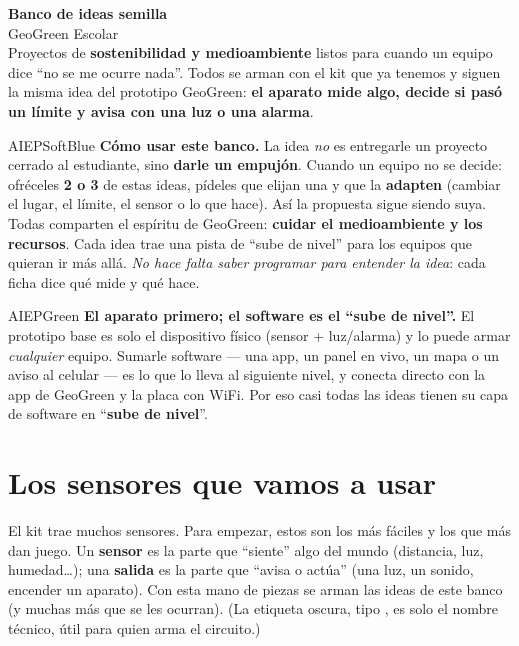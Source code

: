 \documentclass[11pt,letterpaper]{article}
\newcommand{\serig}[1]{%
  \tcbox[on line, colback=AIEPInk, colframe=AIEPInk, boxrule=0pt,
    arc=0.8mm, left=1.8mm, right=1.8mm, top=0.5mm, bottom=0.5mm]%
    {\small\bfseries\textcolor{white}{\texttt{#1}}}%
}
\begin{document}
\begin{tcolorbox}[enhanced, colback=AIEPNavy, colframe=AIEPNavy, arc=0mm,
  boxrule=0pt, left=6mm, right=6mm, top=6mm, bottom=6mm]
{\color{white}\Huge\bfseries Banco de ideas semilla}\\[3mm]
{\color{white}\Large GeoGreen Escolar}\\[4mm]
{\color{AIEPSoftBlue}\large Proyectos de \textbf{sostenibilidad y medioambiente} listos para cuando
un equipo dice ``no se me ocurre nada''. Todos se arman con el kit que ya tenemos y siguen la misma
idea del prototipo GeoGreen: \textbf{el aparato mide algo, decide si pasó un límite y avisa con una
luz o una alarma}.}
\end{tcolorbox}

\begin{infobox}{AIEPSoftBlue}
\textbf{Cómo usar este banco.}
La idea \emph{no} es entregarle un proyecto cerrado al estudiante, sino \textbf{darle un empujón}.
Cuando un equipo no se decide: ofréceles \textbf{2 o 3} de estas ideas, pídeles que elijan una y
que la \textbf{adapten} (cambiar el lugar, el límite, el sensor o lo que hace). Así la propuesta
sigue siendo suya. Todas comparten el espíritu de GeoGreen: \textbf{cuidar el medioambiente y los
recursos}. Cada idea trae una pista de ``\textcolor{AIEPGreen}{sube de nivel}'' para los equipos
que quieran ir más allá. \emph{No hace falta saber programar para entender la idea}: cada ficha dice
qué mide y qué hace.
\end{infobox}

\begin{infobox}{AIEPGreen}
\textbf{El aparato primero; el software es el ``sube de nivel''.} El prototipo base es solo el
dispositivo físico (sensor + luz/alarma) y lo puede armar \emph{cualquier} equipo. Sumarle
software --- una app, un panel en vivo, un mapa o un aviso al celular --- es lo que lo lleva al
siguiente nivel, y conecta directo con la app de GeoGreen y la placa con WiFi. Por eso casi todas
las ideas tienen su capa de software en ``\textbf{sube de nivel}''.
\end{infobox}

\section{Los sensores que vamos a usar}
El kit trae muchos sensores. Para empezar, estos son los más fáciles y los que más dan juego.
Un \textbf{sensor} es la parte que ``siente'' algo del mundo (distancia, luz, humedad\ldots); una
\textbf{salida} es la parte que ``avisa o actúa'' (una luz, un sonido, encender un aparato).
Con esta mano de piezas se arman las ideas de este banco (y muchas más que se les ocurran).
(La etiqueta oscura, tipo \serig{HC-SR04}, es solo el nombre técnico, útil para quien arma el
circuito.)
\end{document}

